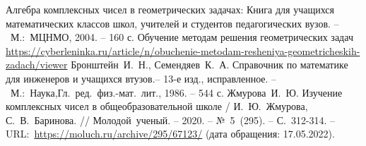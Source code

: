 \begin{thebibliography}{00}
     Алгебра комплексных чисел в геометрических задачах:
    Книга для учащихся математических классов школ, учителей и студентов педагогических вузов. --~М.:~МЦНМО,
    2004. -- 160 с.
     Обучение методам решения геометрических задач\\
    \href{https://cyberleninka.ru/article/n/obuchenie-metodam-resheniya-geometricheskih-zadach/viewer}{https://cyberleninka.ru/article/n/obuchenie-metodam-resheniya-geometricheskih-zadach/viewer}
     Бронштейн~И.~Н., Семендяев~К.~А. Справочник по математике для инженеров и учащихся втузов.-- 13-е изд., исправленное. --~М.:~Наука,Гл.~ред.~физ.-мат.~лит., 1986. -- 544 с.
     Жмурова~И.~Ю. Изучение комплексных чисел в общеобразовательной школе / И.~Ю.~Жмурова, С.~В.~Баринова. // Молодой~ученый. -- 2020. -- №~5~(295). -- С.~312-314. -- URL:~\href{https://moluch.ru/archive/295/67123/}{https://moluch.ru/archive/295/67123/} (дата обращения: 17.05.2022).
\end{thebibliography}
